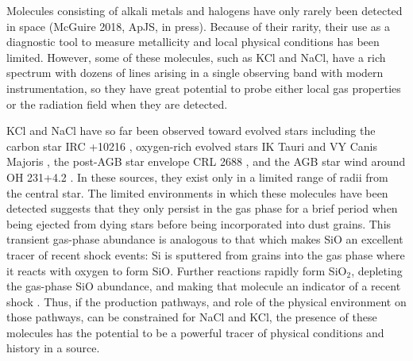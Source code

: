 \documentclass[twocolumn]{aastex62}
\newcommand{\sourcei}{SrcI\xspace}
\newcommand{\bam}[1]{\textcolor{green!65!black}{\textbf{[BAM: #1]}}}
\newcommand{\rlp}[1]{\textcolor{blue!65!black}{\textbf{[RLP: #1]}}}
\begin{document}




Molecules consisting of alkali metals and halogens have only rarely been
detected in space (McGuire 2018, ApJS, in press).
Because of their rarity, their use as a diagnostic
tool to measure metallicity and local physical conditions has been limited.
However, some of these molecules, such as KCl and NaCl, have a rich spectrum
with dozens of lines arising in a single observing band with modern
instrumentation, so they have great potential to probe either local gas properties
or the radiation field when they are detected.


KCl and NaCl have so far been observed toward evolved stars including the carbon star IRC
+10216 \citep{Cernicharo1987a}, oxygen-rich evolved stars IK Tauri and VY Canis
Majoris \citep{Milam2007a}, the post-AGB star envelope CRL 2688
\citep{Highberger2003a}, and the AGB star wind around OH 231+4.2
\citep{Sanchez-Contreras2018a}.  In these sources, they exist only in a limited
range of radii from the central star.  The limited environments in which these
molecules have been detected suggests that they only persist in the gas phase
for a brief period when being ejected from dying stars before being
incorporated into dust grains.
This transient gas-phase abundance is analogous to that which makes SiO an
excellent tracer of recent shock events: Si is sputtered from grains into the
gas phase where it reacts with oxygen to form SiO.  Further reactions rapidly
form SiO$_2$, depleting the gas-phase SiO abundance, and making that molecule
an indicator of a recent shock \citep{Schilke1997a}.  Thus, if the production
pathways, and role of the physical environment on those pathways, can be
constrained for NaCl and KCl, the presence of these molecules has the potential
to be a powerful tracer of physical conditions and history in a source. 
\end{document}
